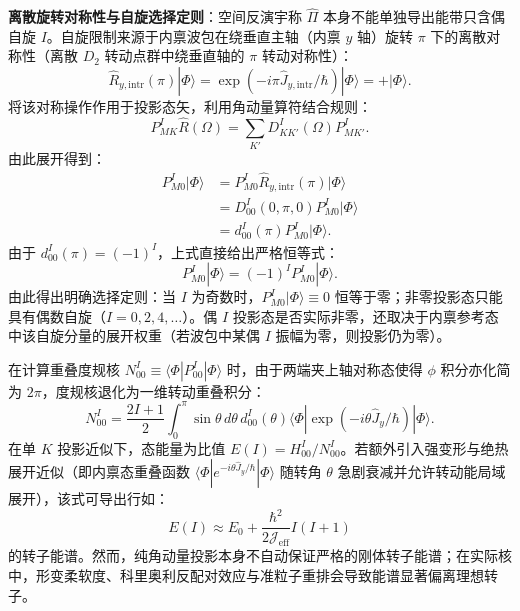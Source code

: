\textbf{离散旋转对称性与自旋选择定则}：空间反演宇称 $\hat{\Pi}$ 本身不能单独导出能带只含偶自旋 $I$。自旋限制来源于内禀波包在绕垂直主轴（内禀 $y$ 轴）旋转 $\pi$ 下的离散对称性（离散 $D_2$ 转动点群中绕垂直轴的 $\pi$ 转动对称性）：
\begin{equation}\label{eq:2-5-Ry-symmetry}
\hat{R}_{y, \text{intr}}(\pi) |\Phi\rangle = \exp(-i\pi \hat{J}_{y, \text{intr}} / \hbar) |\Phi\rangle = + |\Phi\rangle.
\end{equation}
将该对称操作作用于投影态矢，利用角动量算符结合规则：
\begin{equation}\label{eq:2-5-P-rot-commute}
P^I_{MK} \hat{R}(\Omega) = \sum_{K'} D^I_{K K'}(\Omega) P^I_{MK'}.
\end{equation}
由此展开得到：
\begin{align}\label{eq:2-5-spin-selection-derivation}
P^I_{M0} |\Phi\rangle &= P^I_{M0} \hat{R}_{y, \text{intr}}(\pi) |\Phi\rangle \nonumber \\
&= D^I_{00}(0, \pi, 0) P^I_{M0} |\Phi\rangle \nonumber \\
&= d^I_{00}(\pi) P^I_{M0} |\Phi\rangle.
\end{align}
由于 $d^I_{00}(\pi) = (-1)^I$，上式直接给出严格恒等式：
\begin{equation}\label{eq:2-5-even-spin-condition}
P^I_{M0} |\Phi\rangle = (-1)^I P^I_{M0} |\Phi\rangle.
\end{equation}
由此得出明确选择定则：当 $I$ 为奇数时，$P^I_{M0} |\Phi\rangle \equiv 0$ 恒等于零；非零投影态只能具有偶数自旋（$I = 0, 2, 4, \dots$）。偶 $I$ 投影态是否实际非零，还取决于内禀参考态中该自旋分量的展开权重（若波包中某偶 $I$ 振幅为零，则投影仍为零）。

在计算重叠度规核 $N^I_{00} \equiv \langle \Phi | P^I_{00} | \Phi \rangle$ 时，由于两端夹上轴对称态使得 $\phi$ 积分亦化简为 $2\pi$，度规核退化为一维转动重叠积分：
\begin{equation}\label{eq:2-5-axial-norm-integral}
N^I_{00} = \frac{2I+1}{2} \int_0^\pi \sin\theta \, d\theta \, d^I_{00}(\theta) \langle \Phi | \exp(-i \theta \hat{J}_y / \hbar) | \Phi \rangle.
\end{equation}
在单 $K$ 投影近似下，态能量为比值 $E(I) = H^I_{00} / N^I_{00}$。若额外引入强变形与绝热展开近似（即内禀态重叠函数 $\langle \Phi | e^{-i\theta \hat{J}_y/\hbar} | \Phi \rangle$ 随转角 $\theta$ 急剧衰减并允许转动能局域展开），该式可导出行如：
\begin{equation}\label{eq:2-5-rot-band-emergence}
E(I) \approx E_0 + \frac{\hbar^2}{2\mathcal{J}_{\text{eff}}} I(I+1)
\end{equation}
的转子能谱。然而，纯角动量投影本身不自动保证严格的刚体转子能谱；在实际核中，形变柔软度、科里奥利反配对效应与准粒子重排会导致能谱显著偏离理想转子。
